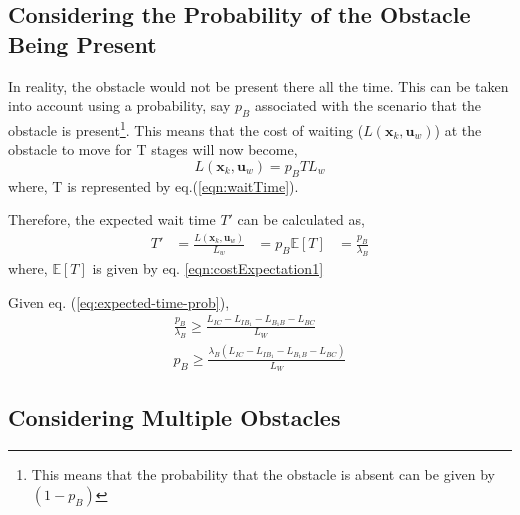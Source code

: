 \documentclass[a4paper,12pt]{article}
\begin{document}
		\subsection{Considering the Probability of the Obstacle Being Present}
		In reality, the obstacle would not be present there all the time. This can be taken into account using a probability, say $p_B$ associated with the scenario that the obstacle is present\footnote{This means that the probability that the obstacle is absent can be given by $ (1-p_B) $}. This means that the cost of waiting ($ L(\boldsymbol{x}_k,\boldsymbol{u}_w) $) at the obstacle to move for T stages will now become,
		\begin{equation}
			L(\boldsymbol{x}_k,\boldsymbol{u}_w) = p_B T L_w
		\end{equation}
		where, T is represented by eq.(\ref{eqn:waitTime}). 
		
		Therefore, the expected wait time $T'$ can be calculated as,
		\begin{equation}
		\begin{aligned}
		T'&= \frac{L(\boldsymbol{x}_k,\boldsymbol{u}_w)}{L_w}
		&= p_B \mathbb{E}[T]
		&= \frac{p_B}{\lambda_B}
		\end{aligned}
		\label{eq:expected-time-prob}
		\end{equation}
		where, $\mathbb{E}[T]$ is given by eq. \ref{eqn:costExpectation1}
		
		Given eq. (\ref{eq:expected-time-prob}), 
		\begin{equation}
		\begin{split}
		\frac{p_B}{\lambda_B} \geq \frac{L_{IC}-L_{IB_1}-L_{B_1B}-L_{BC}}{L_W} \\
		p_B \geq \frac{\lambda_B\left(L_{IC}-L_{IB_1}-L_{B_1B}-L_{BC}\right)}{L_W}
		\end{split}
		\label{eqn:constraintPlanAtStartwithProbability}
		\end{equation}
		
		
		
		\subsection{Considering Multiple Obstacles}
\end{document}
